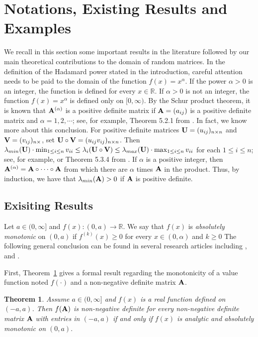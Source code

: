 \documentclass[conference,letterpaper]{IEEEtran}
\numberwithin{equation}{section}
\newcommand{\lbl}{\label}
\newcommand{\bd}{\bold}
\newtheorem{theorem}{{\sc Theorem}}[section]
\begin{document}
\section{Notations, Existing Results and Examples}\lbl{sec:notations}
We recall in this section some important results in the literature followed by our main theoretical contributions to the domain of random matrices.
In the definition of the Hadamard power stated in the introduction, careful attention needs to be paid to the domain of the function $f(x)=x^{\alpha}$. 
If the power $\alpha>0$ is an integer, the function is defined for every $x\in \mathbb{R}.$ If $\alpha>0$ is not an integer, the function $f(x)=x^{\alpha}$ is defined only on $[0, \infty).$ By the Schur product theorem, it is known that $\bd{A}^{(\alpha)}$ is a positive definite matrix if $\bd{A}=(a_{ij})$ is a positive definite matrix and $\alpha =1,2, \cdots$; see, for example, Theorem 5.2.1 from \cite{horn_johnson_1991}. In fact, we know more about this conclusion. For positive definite matrices $\bd{U}=(u_{ij})_{n\times n}$ and $\bd{V}=(v_{ij})_{n\times}$, set $\bd{U}\circ \bd{V}=(u_{ij}v_{ij})_{n\times n}$. Then  $\lambda_{min}(\bd{U})\cdot\min_{1\leq i \leq n}{v_{ii}}\leq \lambda_i(\bd{U}\circ \bd{V})\leq \lambda_{max}(\bd{U})\cdot\max_{1\leq i \leq n}{v_{ii}}$ for each $1\leq i \leq n$; see, for example, \cite{schur1911bemerkungen} or Theorem 5.3.4 from \cite{horn_johnson_1991}. If $\alpha$ is a positive integer, then  $\bd{A}^{(\alpha)}=\bd{A}\circ\cdots\circ\bd{A}$ from which there are $\alpha$ times $\bd{A}$ in the product. Thus, by induction, we have that $\lambda_{min}(\bd{A})>0$ if $\bd{A}$ is positive definite.


\subsection{Exisiting Results}\lbl{known_results}

 Let $a \in (0, \infty]$ and $f(x): (0, a)\to \mathbb{R}$. 
 We say that $f(x)$ is {\it absolutely monotonic} on  $(0, a)$ if $f^{(k)}(x)\geq 0$ for every $x\in (0, \alpha)$ and $k\geq0$ 
 The following general conclusion can be found in several research articles including \cite{schoenberg1988positive},  \cite{vasudeva1979positive} and \cite{hiai2009monotonicity}.

First, Theorem~\ref{oldth1} gives a formal result regarding the monotonicity of a value function noted $f(\cdot)$ and a non-negative definite matrix $\bd{A}$.
\begin{theorem} \label{oldth1}
Assume $a \in (0, \infty]$ and $f(x)$ is a real function defined on $(-a, a)$.  
Then $f(\bd{A})$ is non-negative definite for every non-negative definite matrix  $\bd{A}$ with  entries in $(-a, a)$ if and only if $f(x)$ is analytic and absolutely monotonic on $(0, a).$
\end{theorem}
\end{document}
